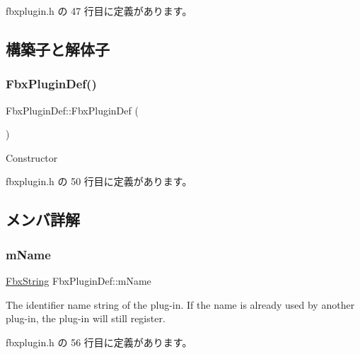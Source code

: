  fbxplugin.\+h の 47 行目に定義があります。



\subsection{構築子と解体子}
\mbox{\label{struct_fbx_plugin_def_af1895c60f86c6d173758a6c3f6979d32}} 
\subsubsection{\texorpdfstring{Fbx\+Plugin\+Def()}{FbxPluginDef()}}
{\footnotesize\ttfamily Fbx\+Plugin\+Def\+::\+Fbx\+Plugin\+Def (\begin{DoxyParamCaption}{ }\end{DoxyParamCaption})\hspace{0.3cm}{\ttfamily [inline]}}



Constructor 



 fbxplugin.\+h の 50 行目に定義があります。



\subsection{メンバ詳解}
\mbox{\label{struct_fbx_plugin_def_ac98378284bf666cbba614e9121ba7189}} 
\subsubsection{\texorpdfstring{m\+Name}{mName}}
{\footnotesize\ttfamily \hyperlink{class_fbx_string}{Fbx\+String} Fbx\+Plugin\+Def\+::m\+Name}



The identifier name string of the plug-\/in. If the name is already used by another plug-\/in, the plug-\/in will still register. 



 fbxplugin.\+h の 56 行目に定義があります。

\mbox{\label{struct_fbx_plugin_def_aeea048adb24ec74cb906df076bedf21d}} 
